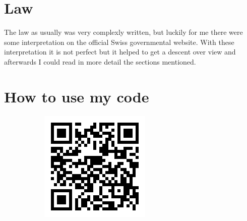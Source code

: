 \documentclass[11pt]{article}
\begin{document}
\section{Law}
The law as usually was very complexly written, but luckily for me there were some interpretation on the official Swiss governmental website. With these interpretation it is not perfect but it helped to get a descent over view and afterwards I could read in more detail the sections mentioned.

\section{How to use my code}
\begin{figure}[ht]
\centering
\begin{subfigure}[b]{0.45\linewidth}
\centering\includegraphics[width = 0.9\linewidth]{images/git.edu-qrcode.png}
\caption{\label{fig:qredu}}
\end{subfigure}
\begin{subfigure}[b]{0.45\linewidth}

\end{subfigure}
\end{figure}
\end{document}
